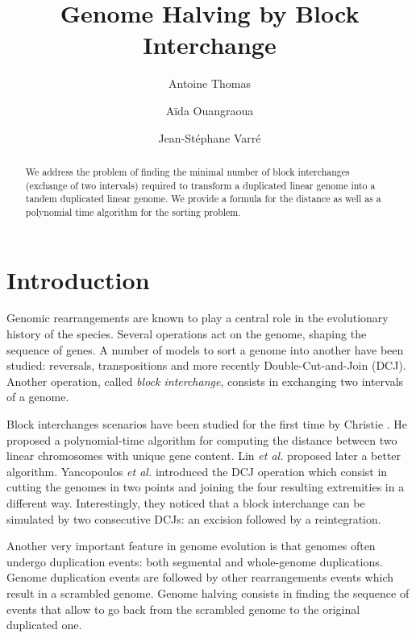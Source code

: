 \documentclass{llncs}
\title{Genome Halving by Block Interchange}
\author{Antoine Thomas \and A{\"i}da Ouangraoua \and Jean-St{\'e}phane Varr{\'e}}
\institute{LIFL, UMR 8022 CNRS, Universit\'e Lille 1
  \\ INRIA Lille, Villeneuve d'Ascq, France}
\def\etal{\textsl{et al.}\xspace}
\begin{document}
\maketitle

\begin{abstract}
    We address the problem of finding the minimal number of block
    interchanges (exchange of two intervals) required to transform a
    duplicated linear genome into a tandem duplicated linear genome. We
    provide a formula for the distance as well as a polynomial time
    algorithm for the sorting problem.
\end{abstract}

\section{Introduction}
\label{sec:intro}

Genomic rearrangements are known to play a central role in the
evolutionary history of the species. Several operations act on the
genome, shaping the sequence of genes. A number of models to sort 
a genome into another have been studied: reversals,
transpositions and more recently Double-Cut-and-Join (DCJ). 
Another operation, called
\emph{block interchange}, consists in exchanging two intervals of a
genome. 

Block interchanges scenarios have been studied for the first time by
Christie \cite{Christie96}. He proposed a polynomial-time algorithm
for computing the distance between two linear chromosomes with unique
gene content. Lin \etal \cite{Lin05} proposed later a better algorithm.
Yancopoulos \etal \cite{Yancopoulos05} introduced the DCJ operation 
which consist in
cutting the genomes in two points and joining the four resulting
extremities in a different way. Interestingly, they noticed that a
block interchange can be simulated by two consecutive DCJs: an
excision followed by a reintegration. 

Another very important feature in genome evolution is that genomes
often undergo duplication events: both segmental and whole-genome
duplications. Genome duplication events are followed by other
rearrangements events which result in a scrambled genome. Genome
halving consists in finding the sequence of events that allow to go
back from the scrambled genome to the original duplicated one.
\end{document}
